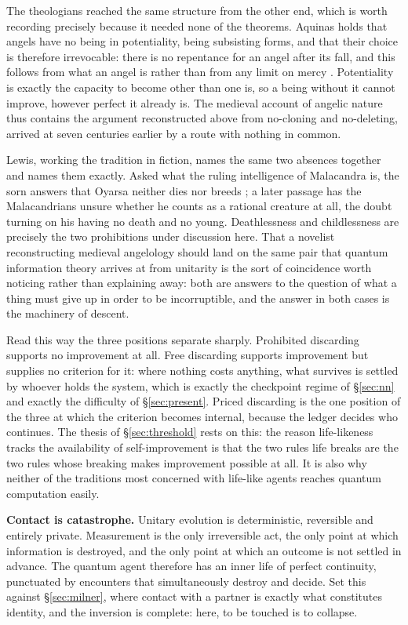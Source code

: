 \documentclass[11pt,a4paper]{article}
\begin{document}
The theologians reached the same structure from the other end, which is worth
recording precisely because it needed none of the theorems. Aquinas holds that
angels have no being in potentiality, being subsisting forms, and that their
choice is therefore irrevocable: there is no repentance for an angel after its
fall, and this follows from what an angel is rather than from any limit on mercy
\cite{aquinas}. Potentiality is exactly the capacity to become other than one
is, so a being without it cannot improve, however perfect it already is. The
medieval account of angelic nature thus contains the argument reconstructed above
from no-cloning and no-deleting, arrived at seven centuries earlier by a route
with nothing in common.

Lewis, working the tradition in fiction, names the same two absences together and
names them exactly. Asked what the ruling intelligence of Malacandra is, the sorn
answers that Oyarsa neither dies nor breeds \cite{lewis1938}; a later passage has
the Malacandrians unsure whether he counts as a rational creature at all, the
doubt turning on his having no death and no young. Deathlessness and
childlessness are precisely the two prohibitions under discussion here. That a
novelist reconstructing medieval angelology should land on the same pair that
quantum information theory arrives at from unitarity is the sort of coincidence
worth noticing rather than explaining away: both are answers to the question of
what a thing must give up in order to be incorruptible, and the answer in both
cases is the machinery of descent.

Read this way the three positions separate sharply. Prohibited discarding
supports no improvement at all. Free discarding supports improvement but supplies
no criterion for it: where nothing costs anything, what survives is settled by
whoever holds the system, which is exactly the checkpoint regime of
\S\ref{sec:nn} and exactly the difficulty of \S\ref{sec:present}. Priced
discarding is the one position of the three at which the criterion becomes
internal, because the ledger decides who continues. The thesis of
\S\ref{sec:threshold} rests on this: the reason life-likeness tracks the
availability of self-improvement is that the two rules life breaks are the two
rules whose breaking makes improvement possible at all. It is also why neither of
the traditions most concerned with life-like agents reaches quantum computation
easily.

\textbf{Contact is catastrophe.} Unitary evolution is deterministic, reversible
and entirely private. Measurement is the only irreversible act, the only point at
which information is destroyed, and the only point at which an outcome is not
settled in advance. The quantum agent therefore has an inner life of perfect
continuity, punctuated by encounters that simultaneously destroy and decide. Set
this against \S\ref{sec:milner}, where contact with a partner is exactly what
constitutes identity, and the inversion is complete: here, to be touched is to
collapse.
\end{document}

